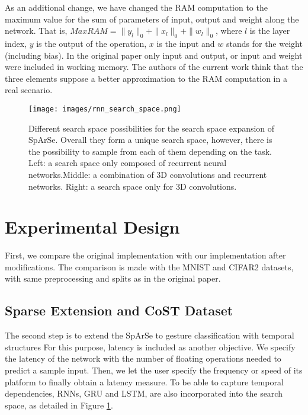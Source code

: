 \documentclass[a4paper, twocolumn]{article}
\begin{document}
As an additional change, we have changed the RAM computation to the maximum value for the sum of parameters of input, output and weight along the network. That is, $MaxRAM = \|y_{l}\|_{0} + \|x_{l}\|_{0} + \|w_{l}\|_{0}$, where $l$ is the layer index, $y$ is the output of the operation, $x$ is the input and $w$ stands for the weight (including bias). In the original paper only input and output, or input and weight were included in working memory. The authors of the current work think that the three elements suppose a better approximation to the RAM computation in a real scenario.

\begin{figure}
	\centering
	\texttt{[image: images/rnn\_search\_space.png]}
	\caption{Different search space possibilities for the search space expansion of SpArSe. Overall they form a unique search space, however, there is the possibility to sample from each of them depending on the task. Left: a search space only composed of recurrent neural networks.Middle: a combination of 3D convolutions and recurrent networks. Right: a search space only for 3D convolutions.}
	\label{fig:rnnsearchspace}
\end{figure}

\section{Experimental Design}

First, we compare the original implementation with our implementation after modifications. The comparison is made with the MNIST and CIFAR2 \cite{Jose2013} datasets, with same preprocessing and splits as in the original paper.

\subsection{Sparse Extension and CoST Dataset}\label{Dataset}

The second step is to extend the SpArSe to gesture classification with temporal structures For this purpose, latency is included as another objective. We specify the latency of the network with the number of floating operations needed to predict a sample input. Then, we let the user specify the frequency or speed of its platform to finally obtain a latency measure. To be able to capture temporal dependencies, RNNs, GRU and LSTM, are also incorporated into the search space, as detailed in Figure \ref{fig:rnnsearchspace}. 
\end{document}
